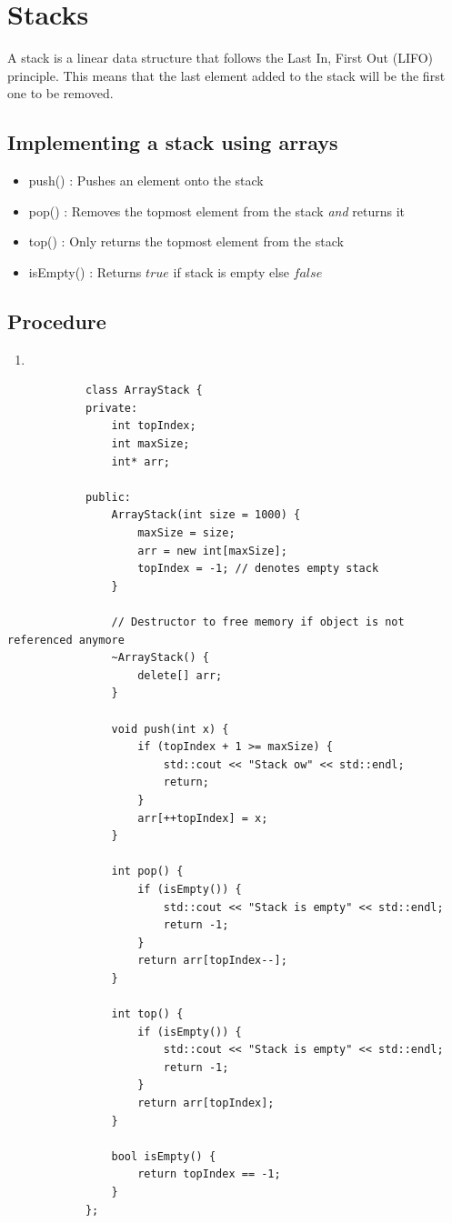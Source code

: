 \documentclass[a4paper, 12pt]{book}
\begin{document}
	\newpage
	
	\section{Stacks}
	A stack is a linear data structure that follows the Last In, First Out (LIFO) principle. This means that the last element added to the stack will be the first one to be removed.
	\subsection{Implementing a stack using arrays} 
	
	\begin{itemize}
		\item push() : Pushes an element onto the stack
		\item pop() : Removes the topmost element from the stack \emph{and} returns it
		\item {top()} : Only returns the topmost element from the stack 
		\item {isEmpty()} : Returns $true$ if stack is empty else $false$
	\end{itemize}
	\vspace{\baselineskip}
	\subsection{Procedure}
	\begin{enumerate}
		\item 
	\end{enumerate}
	\newpage
	
	\begin{tcolorbox}[title=ArrayStack class]
		\begin{verbatim}
			class ArrayStack {
			private:
				int topIndex;
				int maxSize;
				int* arr;
				
			public:
				ArrayStack(int size = 1000) {
					maxSize = size;
					arr = new int[maxSize];
					topIndex = -1; // denotes empty stack
				}
				
				// Destructor to free memory if object is not referenced anymore
				~ArrayStack() {
					delete[] arr;
				}
				
				void push(int x) {
					if (topIndex + 1 >= maxSize) {
						std::cout << "Stack ow" << std::endl;
						return;
					}
					arr[++topIndex] = x;
				}
				
				int pop() {
					if (isEmpty()) {
						std::cout << "Stack is empty" << std::endl;
						return -1;
					}
					return arr[topIndex--];
				}
				
				int top() {
					if (isEmpty()) {
						std::cout << "Stack is empty" << std::endl;
						return -1;
					}
					return arr[topIndex];
				}
				
				bool isEmpty() {
					return topIndex == -1;
				}
			};
		\end{verbatim}
	\end{tcolorbox}
	
\end{document}
